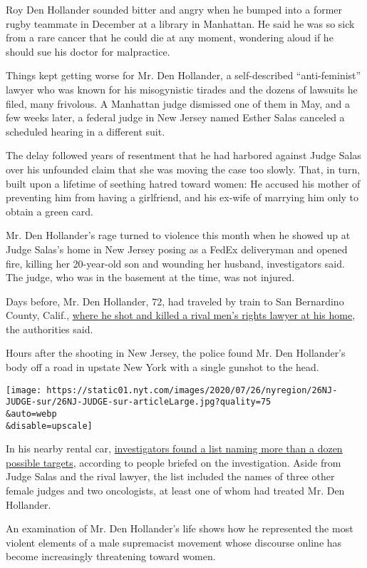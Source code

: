 Roy Den Hollander sounded bitter and angry when he bumped into a former
rugby teammate in December at a library in Manhattan. He said he was so
sick from a rare cancer that he could die at any moment, wondering aloud
if he should sue his doctor for malpractice.

Things kept getting worse for Mr. Den Hollander, a self-described
``anti-feminist'' lawyer who was known for his misogynistic tirades and
the dozens of lawsuits he filed, many frivolous. A Manhattan judge
dismissed one of them in May, and a few weeks later, a federal judge in
New Jersey named Esther Salas canceled a scheduled hearing in a
different suit.

The delay followed years of resentment that he had harbored against
Judge Salas over his unfounded claim that she was moving the case too
slowly. That, in turn, built upon a lifetime of seething hatred toward
women: He accused his mother of preventing him from having a girlfriend,
and his ex-wife of marrying him only to obtain a green card.

Mr. Den Hollander's rage turned to violence this month when he showed up
at Judge Salas's home in New Jersey posing as a FedEx deliveryman and
opened fire, killing her 20-year-old son and wounding her husband,
investigators said. The judge, who was in the basement at the time, was
not injured.

Days before, Mr. Den Hollander, 72, had traveled by train to San
Bernardino County, Calif.,
\href{https://www.nytimes.com/2020/07/22/nyregion/roy-den-hollander-esther-salas.html}{where
he shot and killed a rival men's rights lawyer at his home}, the
authorities said.

Hours after the shooting in New Jersey, the police found Mr. Den
Hollander's body off a road in upstate New York with a single gunshot to
the head.

\texttt{[image: https://static01.nyt.com/images/2020/07/26/nyregion/26NJ-JUDGE-sur/26NJ-JUDGE-sur-articleLarge.jpg?quality=75\\\&auto=webp\\\&disable=upscale]}

In his nearby rental car,
\href{https://www.nytimes.com/2020/07/25/nyregion/roy-den-hollander-esther-salas-list.html}{investigators
found a list naming more than a dozen possible targets}, according to
people briefed on the investigation. Aside from Judge Salas and the
rival lawyer, the list included the names of three other female judges
and two oncologists, at least one of whom had treated Mr. Den Hollander.

An examination of Mr. Den Hollander's life shows how he represented the
most violent elements of a male supremacist movement whose discourse
online has become increasingly threatening toward women.

